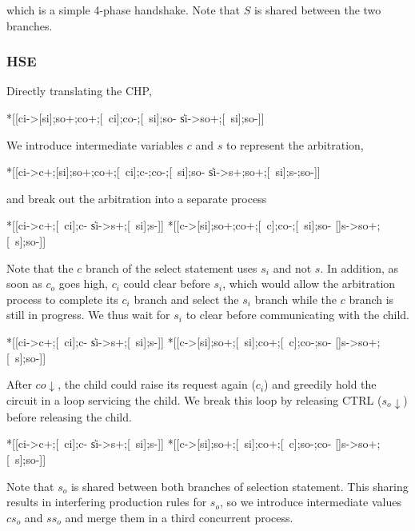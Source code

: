 \documentclass[aer.tex]{subfiles}
\begin{document}
\noindent which is a simple 4-phase handshake. Note that $S$ is shared between the two branches.

\subsubsection*{HSE}

\noindent Directly translating the CHP,

\begin{hse}
*[[ci->[si];so+;co+;[~ci];co-;[~si];so-
  \|si->so+;[~si];so-]]
\end{hse}

\noindent We introduce intermediate variables $c$ and $s$ to represent the arbitration,

\begin{hse}
*[[ci->c+;[si];so+;co+;[~ci];c-;co-;[~si];so-
  \|si->s+;so+;[~si];s-;so-]]
\end{hse}

\noindent and break out the arbitration into a separate process

\begin{hse}
*[[ci->c+;[~ci];c-
  \|si->s+;[~si];s-]]
*[[c->[si];so+;co+;[~c];co-;[~si];so-
  []s->so+;[~s];so-]]
\end{hse}

\noindent Note that the $c$ branch of the select statement uses $s_i$ and not $s$. In addition, as soon as $c_o$ goes high, $c_i$ could clear before $s_i$, which would allow the arbitration process to complete its $c_i$ branch and select the $s_i$ branch while the $c$ branch is still in progress. We thus wait for $s_i$ to clear before communicating with the child.

\begin{hse}
*[[ci->c+;[~ci];c-
  \|si->s+;[~si];s-]]
*[[c->[si];so+;[~si];co+;[~c];co-;so-
  []s->so+;[~s];so-]]
\end{hse}

\noindent After $co\!\downarrow$, the child could raise its request again ($c_i$) and greedily hold the circuit in a loop servicing the child. We break this loop by releasing CTRL ($s_o\!\downarrow$) before releasing the child.

\begin{hse}
*[[ci->c+;[~ci];c-
  \|si->s+;[~si];s-]]
*[[c->[si];so+;[~si];co+;[~c];so-;co-
  []s->so+;[~s];so-]]
\end{hse}

\noindent Note that $s_o$ is shared between both branches of selection statement. This sharing results in interfering production rules for $s_o$, so we introduce intermediate values $cs_o$ and $ss_o$ and merge them in a third concurrent process.
\end{document}
